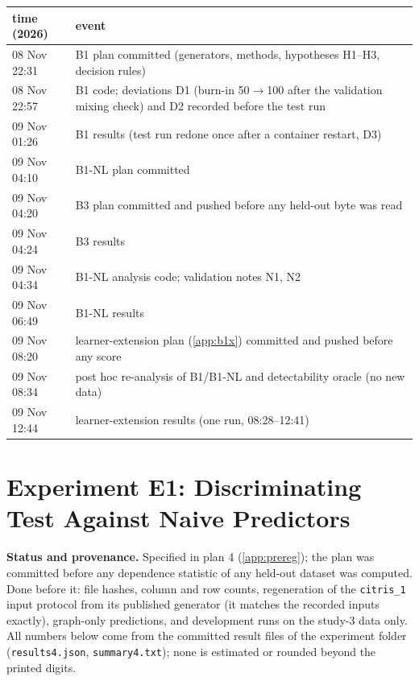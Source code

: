 \begin{center}\small
\begin{tabular}{p{}p{}}
\toprule
time (2026) & event \\
\midrule
08 Nov 22:31 & B1 plan committed (generators, methods, hypotheses H1--H3, decision rules) \\
08 Nov 22:57 & B1 code; deviations D1 (burn-in 50$\to$100 after the validation mixing check) and D2 recorded before the test run \\
09 Nov 01:26 & B1 results (test run redone once after a container restart, D3) \\
09 Nov 04:10 & B1-NL plan committed \\
09 Nov 04:20 & B3 plan committed and pushed before any held-out byte was read \\
09 Nov 04:24 & B3 results \\
09 Nov 04:34 & B1-NL analysis code; validation notes N1, N2 \\
09 Nov 06:49 & B1-NL results \\
09 Nov 08:20 & learner-extension plan (\cref{app:b1x}) committed and pushed before any score \\
09 Nov 08:34 & post hoc re-analysis of B1/B1-NL and detectability oracle (no new data) \\
09 Nov 12:44 & learner-extension results (one run, 08:28--12:41) \\
\bottomrule
\end{tabular}
\end{center}



\section{Experiment E1: Discriminating Test Against Naive Predictors}
\label{app:e1}

\textbf{Status and provenance.} Specified in plan 4 (\cref{app:prereg}); the plan was
committed before any dependence statistic of any held-out dataset was computed. Done
before it: file hashes, column and row counts, regeneration of the
\texttt{citris\_1} input protocol from its published generator (it matches the recorded inputs exactly),
graph-only predictions, and development runs on the study-3 data only. All numbers below come from the
committed result files of the experiment folder (\texttt{results4.json}, \texttt{summary4.txt}); none is estimated or rounded beyond the printed digits.

